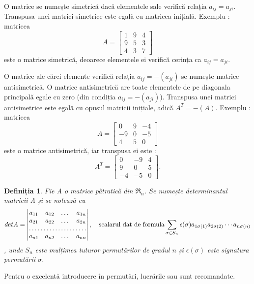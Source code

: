 O matrice se numește simetrică dacă elementele sale verifică relația $a_{ij} =
a_{ji}$. Transpusa unei matrici simetrice este egală cu matricea inițială.
Exemplu : matricea
\begin{equation*}
A = 
\begin{bmatrix}
1 & 9 & 4 \\
9 & 5 & 3 \\
4 & 3 & 7  
\end{bmatrix}
\end{equation*} este o matrice simetrică, deoarece elementele ei verifică
cerința ca $a_{ij} = a_{ji}$.
\indent
 
O matrice ale cărei elemente verifică relația $a_{ij} = -(a_{ji})$ se numește
matrice antisimetrică. O matrice antisimetrică are toate elementele de pe 
diagonala principală egale cu zero (din condiția $a_{ij} = -(a_{ji})$).
Transpusa unei matrici antisimetrice este egală cu opusul matricii inițiale,
adică $A^T = -(A)$.
Exemplu : matricea
\begin{equation*}
A = 
\begin{bmatrix}
0 & 9 & -4 \\
-9 & 0 & -5 \\
4 & 5 & 0
\end{bmatrix}
\end{equation*} este o matrice antisimetrică, iar transpusa ei este :
\begin{equation*}
A^T =
\begin{bmatrix}
0 & -9 & 4 \\
9 & 0 & 5 \\
-4 & -5 & 0
\end{bmatrix}.
\end{equation*}

\newtheorem{th_det}[th_matrixdef]{Definiția}
\begin{th_det}
Fie A o matrice pătratică din $\mathfrak{R}_{n}$. Se numește determinantul
matricii A și se notează cu 
\[
detA = 
\begin{vmatrix}
a_{11} & a_{12} & \dots & a_{1n} \\
a_{21} & a_{22} & \dots & a_{2n} \\
\hdotsfor{4} \\
a_{n1} & a_{n2} & \dots & a_{nn}
\end{vmatrix}, \quad \text{scalarul dat de formula}  
\sum_{\substack{\sigma \in S_{n}}} \epsilon (\sigma) a_{1\sigma(1)}
a_{2\sigma(2)} \cdots a_{n\sigma(n)}
\], unde $S_{n}$ este mulțimea tuturor permutărilor de gradul $\mathit{n}$ și
$\epsilon(\sigma)$ este signatura permutării $\sigma$.
\end{th_det}
Pentru o excelentă introducere în permutări, lucrările \cite{NitaNS96} sau
\cite{Rosculet87} sunt recomandate.

